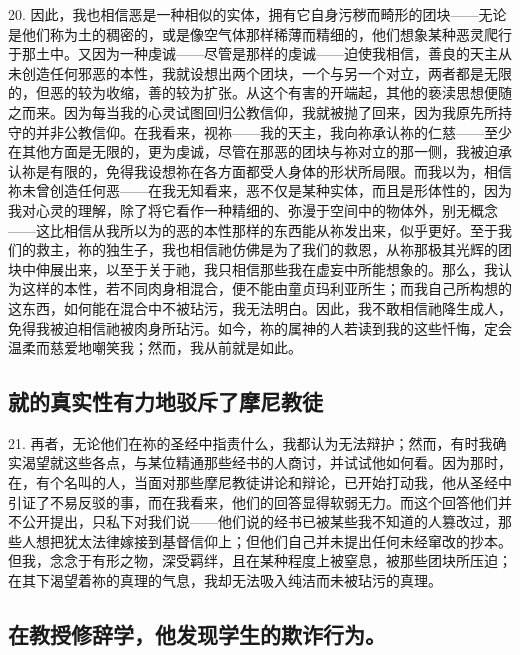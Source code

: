 20. 因此，我也相信恶是一种相似的实体，拥有它自身污秽而畸形的团块——无论是他们称为土的稠密的，或是像空气体那样稀薄而精细的，他们想象某种恶灵爬行于那土中。又因为一种虔诚——尽管是那样的虔诚——迫使我相信，善良的天主从未创造任何邪恶的本性，我就设想出两个团块，一个与另一个对立，两者都是无限的，但恶的较为收缩，善的较为扩张。从这个有害的开端起，其他的亵渎思想便随之而来。因为每当我的心灵试图回归公教信仰，我就被抛了回来，因为我原先所持守的并非公教信仰。在我看来，视祢——我的天主，我向祢承认祢的仁慈——至少在其他方面是无限的，更为虔诚，尽管在那恶的团块与祢对立的那一侧，我被迫承认祢是有限的，免得我设想祢在各方面都受人身体的形状所局限。而我以为，相信祢未曾创造任何恶——在我无知看来，恶不仅是某种实体，而且是形体性的，因为我对心灵的理解，除了将它看作一种精细的、弥漫于空间中的物体外，别无概念——这比相信从我所以为的恶的本性那样的东西能从祢发出来，似乎更好。至于我们的救主，祢的独生子，我也相信祂仿佛是为了我们的救恩，从祢那极其光辉的团块中伸展出来，以至于关于祂，我只相信那些我在虚妄中所能想象的。那么，我认为这样的本性，若不同肉身相混合，便不能由童贞玛利亚所生；而我自己所构想的这东西，如何能在混合中不被玷污，我无法明白。因此，我不敢相信祂降生成人，免得我被迫相信祂被肉身所玷污。如今，祢的属神的人若读到我的这些忏悔，定会温柔而慈爱地嘲笑我；然而，我从前就是如此。\par


\subsection{就的真实性有力地驳斥了摩尼教徒}

21. 再者，无论他们在祢的圣经中指责什么，我都认为无法辩护；然而，有时我确实渴望就这些各点，与某位精通那些经书的人商讨，并试试他如何看。因为那时，在，有个名叫的人，当面对那些摩尼教徒讲论和辩论，已开始打动我，他从圣经中引证了不易反驳的事，而在我看来，他们的回答显得软弱无力。而这个回答他们并不公开提出，只私下对我们说——他们说的经书已被某些我不知道的人篡改过，那些人想把犹太法律嫁接到基督信仰上；但他们自己并未提出任何未经窜改的抄本。但我，念念于有形之物，深受羁绊，且在某种程度上被窒息，被那些团块所压迫；在其下渴望着祢的真理的气息，我却无法吸入纯洁而未被玷污的真理。\par


\subsection{在教授修辞学，他发现学生的欺诈行为。}

